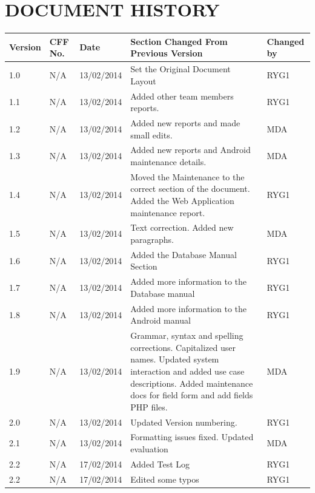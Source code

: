 \documentclass[12pt]{article}
\begin{document}
\section{DOCUMENT HISTORY}
\setlength\LTleft{-0.5cm}
\begin{longtable}{|p{1.3cm}|p{1.5cm}|p{2cm}|p{7cm}| p{2cm}|}
\hline
	Version & CFF No. & Date & Section Changed From Previous Version & Changed by \\
\hline
	1.0&N/A&13/02/2014&Set the Original Document Layout&RYG1
 \\ 
\hline
	1.1&N/A&13/02/2014&Added other team members reports.&RYG1 \\
\hline
	1.2&N/A&13/02/2014&Added new reports and made small edits.&MDA \\
	\hline
	1.3&N/A&13/02/2014&Added new reports and Android maintenance details.&MDA \\
\hline
	1.4&N/A&13/02/2014&Moved the Maintenance to the correct section of the document. Added the Web Application maintenance report.&RYG1 \\
\hline
	1.5&N/A&13/02/2014&Text correction. Added new paragraphs.&MDA \\
\hline	
	1.6&N/A&13/02/2014&Added the Database Manual Section&RYG1 \\
\hline
	1.7&N/A&13/02/2014&Added more information to the Database manual&RYG1 \\
\hline		
	1.8&N/A&13/02/2014&Added more information to the Android manual&RYG1 \\
	\hline
	1.9&N/A&13/02/2014&Grammar, syntax and spelling corrections. Capitalized user names. Updated system interaction and added use case descriptions. Added maintenance docs for field form and add fields PHP files.&MDA \\
	\hline
	2.0&N/A&13/02/2014&Updated Version numbering.&RYG1 \\
	\hline
	2.1&N/A&13/02/2014&Formatting issues fixed. Updated evaluation &MDA \\
	\hline
	2.2&N/A&17/02/2014&Added Test Log &RYG1 \\
	\hline
	2.2&N/A&17/02/2014&Edited some typos&RYG1 \\
	\hline
\end{longtable}
\end{document}
